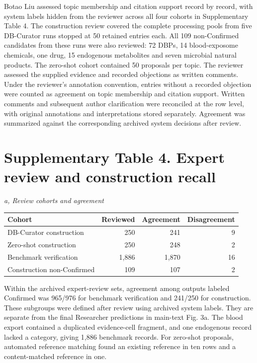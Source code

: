 \documentclass[10pt]{article}
\begin{document}
Botao Liu assessed topic membership and citation support record by record, with system labels hidden from the reviewer across all four cohorts in Supplementary Table 4. The construction review covered the complete processing pools from five DB-Curator runs stopped at 50 retained entries each. All 109 non-Confirmed candidates from these runs were also reviewed: 72 DBPs, 14 blood-exposome chemicals, one drug, 15 endogenous metabolites and seven microbial natural products. The zero-shot cohort contained 50 proposals per topic. The reviewer assessed the supplied evidence and recorded objections as written comments. Under the reviewer's annotation convention, entries without a recorded objection were counted as agreement on topic membership and citation support. Written comments and subsequent author clarification were reconciled at the row level, with original annotations and interpretations stored separately. Agreement was summarized against the corresponding archived system decisions after review.

\section*{Supplementary Table 4. Expert review and construction recall}
\textit{a, Review cohorts and agreement}
\begin{center}\small
\begin{tabular}{lrrr}
\toprule
Cohort & Reviewed & Agreement & Disagreement\\
\midrule
DB-Curator construction & 250 & 241 & 9\\
Zero-shot construction & 250 & 248 & 2\\
Benchmark verification & 1,886 & 1,870 & 16\\
Construction non-Confirmed & 109 & 107 & 2\\
\bottomrule
\end{tabular}
\end{center}
Within the archived expert-review sets, agreement among outputs labeled Confirmed was 965/976 for benchmark verification and 241/250 for construction. These subgroups were defined after review using archived system labels. They are separate from the final Researcher predictions in main-text Fig. 3a. The blood export contained a duplicated evidence-cell fragment, and one endogenous record lacked a category, giving 1,886 benchmark records. For zero-shot proposals, automated reference matching found an existing reference in ten rows and a content-matched reference in one.
\end{document}
